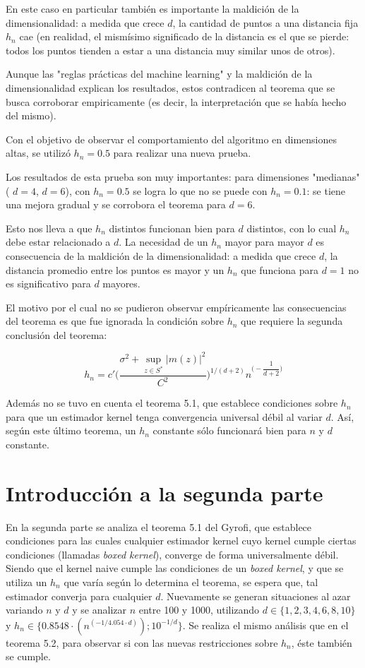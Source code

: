 \documentclass[12pt, a4paper]{article}
\begin{document}
En este caso en particular también es importante la maldición de la dimensionalidad: a medida que crece $d$, la cantidad de puntos a una distancia fija $h_n$ cae (en realidad, el mismísimo significado de la distancia es el que se pierde: todos los puntos tienden a estar a una distancia muy similar unos de otros).

Aunque las "reglas prácticas del machine learning" y la maldición de la dimensionalidad explican los resultados, estos contradicen al teorema que se busca corroborar empiricamente (es decir, la interpretación que se había hecho del mismo).

Con el objetivo de observar el comportamiento del algoritmo en dimensiones altas, se utilizó $h_n=0.5$ para realizar una nueva prueba.

Los resultados de esta prueba son muy importantes: para dimensiones "medianas"  ( $d=4$, $d=6$), con $h_n=0.5$ se logra lo que no se puede con $h_n=0.1$: se tiene una mejora gradual y se corrobora el teorema para $d=6$.

Esto nos lleva a que $h_n$ distintos funcionan bien para $d$ distintos, con lo cual $h_n$ debe estar relacionado a $d$. La necesidad de un $h_n$ mayor para mayor $d$ es consecuencia de la maldición de la dimensionalidad: a medida que crece $d$, la distancia promedio entre los puntos es mayor y un $h_n$ que funciona para $d=1$ no es significativo para $d$ mayores.

El motivo por el cual no se pudieron observar empíricamente las consecuencias del teorema es que fue ignorada la condición sobre $h_n$ que requiere la segunda conclusión del teorema:


$$
h_n = c' \Bigg( \dfrac{\sigma^2 + \mathop{sup}_{z\in S^{*}}|m(z)|^2 }{C^2} \Bigg)^{1/(d+2)} n^{\Big (-\dfrac{1}{d+2}\Big )}
$$

Además no se tuvo en cuenta el teorema 5.1, que establece condiciones sobre $h_n$ para que un estimador kernel tenga convergencia universal débil al variar $d$. Así, según este último teorema, un $h_n$ constante sólo funcionará bien para $n$ y $d$ constante.

\section{Introducción a la segunda parte}
En la segunda parte se analiza el teorema 5.1 del Gyrofi, que establece condiciones para las cuales cualquier estimador kernel cuyo kernel cumple ciertas condiciones (llamadas \textit{boxed kernel}), converge de forma universalmente débil. Siendo que el kernel naive cumple las condiciones de un \textit{boxed kernel}, y que se utiliza un $h_n$ que varía según lo determina el teorema, se espera que, tal estimador converja para cualquier $d$. Nuevamente se generan situaciones al azar variando $n$ y $d$ y se analizar $n$ entre 100 y 1000, utilizando $d\in\{ 1,2,3,4,6,8,10  \}$ y $h_n\in\{ 0.8548\cdot(n^(-1/4.054 \cdot d)); 10^{-1/d} \}$. Se realiza el mismo análisis que en el teorema 5.2, para observar si con las nuevas restricciones sobre $h_n$, éste también se cumple.
\end{document}
